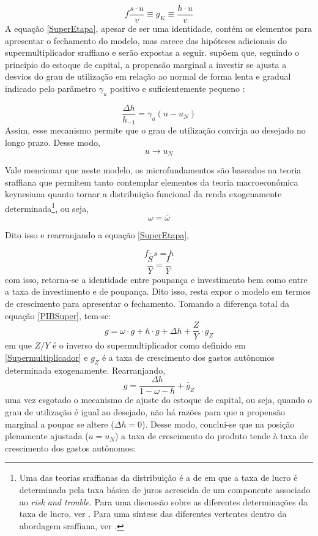 \begin{equation}
\label{SuperEtapa}
f\frac{s\cdot u}{v} \equiv g_K \equiv \frac{h\cdot u}{v}    
\end{equation}
A equação \ref{SuperEtapa}, apesar de ser uma identidade, contém os elementos para apresentar o fechamento do modelo, mas carece das hipóteses adicionais do supermultiplicador sraffiano e serão expostas a seguir. \textcite{freitas_growth_2015} supõem que, seguindo o princípio do estoque de capital, a propensão marginal a investir se ajusta a desvios do grau de utilização em relação ao normal de forma lenta e gradual indicado pelo parâmetro $\gamma_u$ positivo e suficientemente pequeno \cite[p.~271]{freitas_growth_2015}:

$$
\frac{\Delta h}{h_{-1}} = \gamma_u (u - u_N)
$$
Assim, esse mecanismo permite que o grau de utilização convirja ao desejado no longo prazo. Desse modo,
$$
u \to u_N
$$

Vale mencionar que neste modelo, os microfundamentos são baseados na teoria sraffiana que permitem tanto contemplar elementos da teoria macroeconômica keynesiana quanto tornar a distribuição funcional da renda exogenamente determinada\footnote{
	Uma das teorias sraffianas da distribuição é a de \textcite{pivetti_essay_1992} em que a taxa de lucro é determinada pela taxa básica de juros acrescida de um componente associado ao \textit{risk and trouble}.
	Para uma discussão sobre as diferentes determinações da taxa de lucro, ver \textcite{serrano_teoria_1988}.
	Para uma síntese das diferentes vertentes dentro da abordagem sraffiana, ver \textcite{aspromourgos_sraffian_2004}.
}, ou seja,
$$
\omega = \overline \omega
$$

Dito isso e rearranjando a equação \ref{SuperEtapa}, 


$$
f\cdot s = h
$$
$$
\frac{S}{Y} = \frac{I}{Y}
$$
com isso, retorna-se a identidade entre poupança e investimento bem como entre a taxa de investimento e de poupança. 
Dito isso, resta expor o modelo em termos de crescimento para apresentar o fechamento.
Tomando a diferença total da equação \ref{PIBSuper}, tem-se:
$$
g = \omega\cdot g + h\cdot g + \Delta h + \frac{Z}{Y}\cdot \overline g_Z
$$
em que $Z/Y$ é o inverso do supermultiplicador como definido em \ref{Supermultiplicador} e $g_Z$ é a taxa de crescimento dos gastos autônomos determinada exogenamente. Rearranjando, 
\begin{equation}
\label{crescimentosuper}
g = \frac{\Delta h}{1 - \omega - h} + \overline g_Z
\end{equation}
uma vez esgotado o mecanismo de ajuste do estoque de capital, ou seja, quando o grau de utilização é igual ao desejado, não há razões para que a propensão marginal a poupar se altere ($\Delta h = 0$). Desse modo, conclui-se que na posição plenamente ajustada ($u = u_N$) a taxa de crescimento do produto tende à taxa de crescimento dos gastos autônomos:

